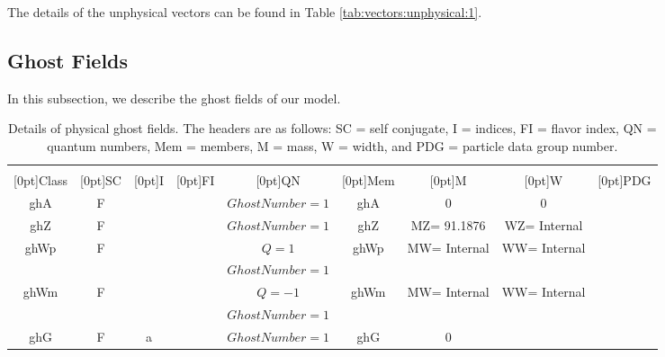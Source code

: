 The details of the unphysical vectors can be found in Table \ref{tab:vectors:unphysical:1}.  \subsection{\label{ghosts}Ghost Fields}
In this subsection, we describe the ghost fields of our model.  \begin{table}[!h]
\begin{center}
\begin{tabular}{|c|c|c|c|c|c|c|c|c|}
\hline
 &  &  &  &  &  &  &  & \\
\raisebox{1.5ex}[0pt]{Class} & \raisebox{1.5ex}[0pt]{SC} & \raisebox{1.5ex}[0pt]{I} & \raisebox{1.5ex}[0pt]{FI} & \raisebox{1.5ex}[0pt]{QN} & \raisebox{1.5ex}[0pt]{Mem} & \raisebox{1.5ex}[0pt]{M} & \raisebox{1.5ex}[0pt]{W} & \raisebox{1.5ex}[0pt]{PDG}\\
\hline\hline
ghA & F & {} & {} & $GhostNumber = 1$ & ghA & 0 & 0 & \\
ghZ & F & {} & {} & $GhostNumber = 1$ & ghZ & {MZ= 91.1876} & {WZ= Internal} & \\
ghWp & F & {} & {} & $Q = 1$ & ghWp & {MW= Internal} & {WW= Internal} & \\
 &  & &  & $GhostNumber = 1$ &  &  &  & \\
ghWm & F & {} & {} & $Q = -1$ & ghWm & {MW= Internal} & {WW= Internal} & \\
 &  & &  & $GhostNumber = 1$ &  &  &  & \\
ghG & F & {a} & {} & $GhostNumber = 1$ & ghG & 0 & {} & \\
\hline
\end{tabular}
\caption[Physical Ghost Fields]{\label{tab:ghosts:physical:1}Details of physical ghost fields.  The headers are as follows:  SC = self conjugate, I = indices, FI = flavor index, QN = quantum numbers, Mem = members, M = mass, W = width, and PDG = particle data group number.}
\end{center}
\end{table}

